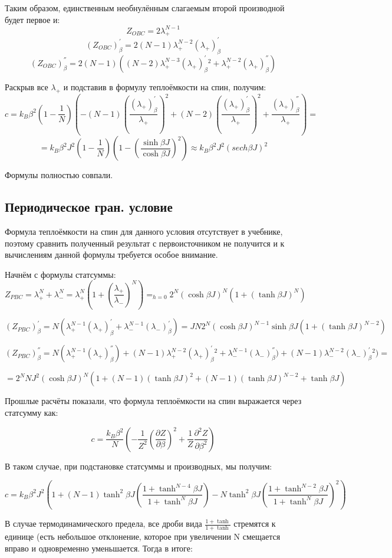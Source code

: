 \documentclass{article}
\newcommand{\bj}{\beta J}
\newcommand{\lp}{\lambda_{+}}
\newcommand{\lm}{\lambda_{-}}
\newcommand{\pbc}{_{PBC}}
\newcommand{\obc}{_{OBC}}
\newcommand{\dzdb}{\frac{\partial Z}{\partial \beta}}
\newcommand{\prpb}{^{'}_{\beta}}
\newcommand{\vprpb}{^{''}_{\beta}}
\numberwithin{equation}{section}
\begin{document}
Таким образом, единственным необнулённым слагаемым второй производной будет первое и:
\[ Z\obc = 2\lp^{N-1} \]
\[ (Z\obc)\prpb = 2(N-1) \lp^{N-2} (\lp)\prpb\]
\[ (Z\obc)\vprpb = 2(N-1)((N-2)\lp^{N-3}(\lp)\prpb ^{2} + \lp^{N-2}(\lp)\vprpb) \]

Раскрыв все $\lp$ и подставив в формулу теплоёмкости на спин, получим:
\[ c = k_{B} \beta^{2} (1 - \frac{1}{N}) (- (N-1) (\frac{(\lp)\prpb}{\lp})^{2} + (N-2) (\frac{(\lp)\prpb}{\lp})^{2} + \frac{(\lp)\vprpb}{\lp}) =\]
\[ = k_{B} \beta^{2} J^{2} (1 - \frac{1}{N}) (1 - (\frac{\sinh{\bj}}{\cosh{\bj}})^{2}) \approx k_{B} \beta^{2} J^{2} (sech \bj)^{2} \]

Формулы полностью совпали.

\subsection{Периодическое гран. условие}

Формула теплоёмкости на спин для данного условия отсутствует в учебнике, поэтому сравнить полученный результат с первоисточником не получится и к вычислениям данной формулы требуется особое внимание.

Начнём с формулы статсуммы:
\[ Z\pbc = \lambda_{+}
 ^{N} + \lambda _{-} ^{N} = \lp^{N}(1 + (\frac{\lp}{\lm})^{N}) =_{h=0} 2^{N} (\cosh{\bj})^{N} (1 + (\tanh{\bj})^{N}) \]
 
 \[ (Z\pbc)\prpb = N(\lp^{N-1} (\lp)\prpb + \lm^{N-1} (\lm)\prpb) = J N 2^{N} (\cosh{\bj})^{N-1} \sinh{\bj} (1 + (\tanh{\bj})^{N-2}) \]
 
 \[ (Z\pbc)\vprpb = N (\lp^{N-1} (\lp)\vprpb) + (N-1)\lp^{N-2} (\lp)\prpb^{2} + \lm^{N-1} (\lm)\vprpb) + (N-1)\lm^{N-2} (\lm)\prpb^{2}) = \]
 
 \[ = 2^{N} N J^{2} (\cosh{\bj})^{N} (1 + (N-1)(\tanh{\bj})^{2} + (N-1)(\tanh{\bj})^{N-2} + \tanh{\bj})\]
 
Прошлые расчёты показали, что формула теплоёмкости на спин выражается через статсумму как:

\[ c = \frac{k_{B} \beta^{2}}{N} (- \frac{1}{Z^{2}} (\dzdb)^{2} + \frac{1}{Z} \frac{\partial^{2} Z}{\partial \beta^{2}}) \]

В таком случае, при подстановке статсуммы и производных, мы получим:

\[ c = k_{B} \beta^{2} J^{2} \left(1 + (N-1) \tanh^{2}\bj (\frac{1 + \tanh^{N-4}\bj}{1 + \tanh^{N}\bj}) - N \tanh^{2}\bj (\frac{1 + \tanh^{N-2}\bj}{1 + \tanh^{N}\bj})^{2}\right) \]

В случае термодинамического предела, все дроби вида $ \frac{1 + \tanh}{1 + \tanh}$ стремятся к единице (есть небольшое отклонение, которое при увеличении N смещается вправо и одновременно уменьшается. Тогда в итоге:
\end{document}
